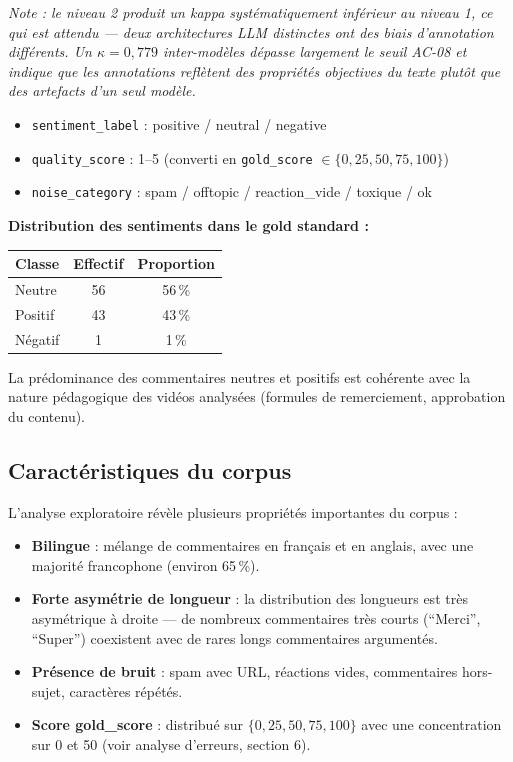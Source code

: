 \documentclass[12pt, a4paper]{article}
\begin{document}
\noindent
\textit{Note : le niveau 2 produit un kappa systématiquement inférieur au niveau 1,
ce qui est attendu — deux architectures LLM distinctes ont des biais d'annotation
différents. Un $\kappa = 0{,}779$ inter-modèles dépasse largement le seuil AC-08
et indique que les annotations reflètent des propriétés objectives du texte
plutôt que des artefacts d'un seul modèle.}

\medskip

\begin{itemize}
  \item \texttt{sentiment\_label} : positive / neutral / negative
  \item \texttt{quality\_score} : 1--5 (converti en \texttt{gold\_score} $\in \{0, 25, 50, 75, 100\}$)
  \item \texttt{noise\_category} : spam / offtopic / reaction\_vide / toxique / ok
\end{itemize}

\textbf{Distribution des sentiments dans le gold standard :}

\begin{center}
\begin{tabular}{lcc}
\toprule
Classe & Effectif & Proportion \\
\midrule
Neutre   & 56 & 56\,\% \\
Positif  & 43 & 43\,\% \\
Négatif  &  1 &  1\,\% \\
\bottomrule
\end{tabular}
\end{center}

La prédominance des commentaires neutres et positifs est cohérente avec la nature
pédagogique des vidéos analysées (formules de remerciement, approbation du contenu).

\subsection{Caractéristiques du corpus}

L'analyse exploratoire révèle plusieurs propriétés importantes du corpus :

\begin{itemize}
  \item \textbf{Bilingue} : mélange de commentaires en français et en anglais,
        avec une majorité francophone (environ 65\,\%).
  \item \textbf{Forte asymétrie de longueur} : la distribution des longueurs est
        très asymétrique à droite --- de nombreux commentaires très courts
        (``Merci'', ``Super'') coexistent avec de rares longs commentaires argumentés.
  \item \textbf{Présence de bruit} : spam avec URL, réactions vides, commentaires
        hors-sujet, caractères répétés.
  \item \textbf{Score gold\_score} : distribué sur $\{0, 25, 50, 75, 100\}$ avec
        une concentration sur 0 et 50 (voir analyse d'erreurs, section 6).
\end{itemize}
\end{document}
